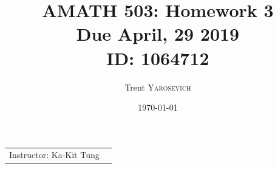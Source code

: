 \documentclass{article}
\title{AMATH 503: Homework 3 \\Due April, 29 2019 \\ ID: 1064712} %
\author{Trent \textsc{Yarosevich}} %
\date{\today} %
\begin{document}
\maketitle %
\setlength\parindent{1cm}

\begin{center}
\begin{tabular}{l r}
Instructor: Ka-Kit Tung %
\end{tabular}
\end{center}
\doublespacing

\end{document}
